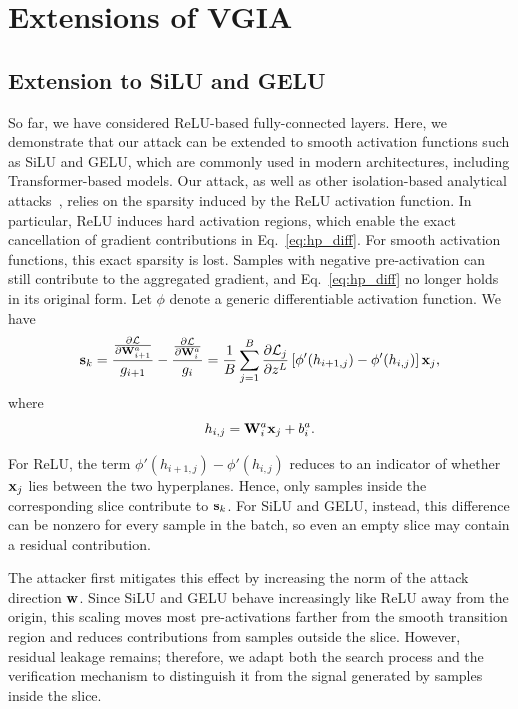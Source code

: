 \section{Extensions of VGIA}

\subsection{Extension to SiLU and GELU}\label{sec:silu_gelu}

So far, we have considered ReLU-based fully-connected layers. Here, we demonstrate that our attack can be extended to smooth activation functions such as SiLU and GELU, which are commonly used in modern architectures, including Transformer-based models. Our attack, as well as other isolation-based analytical attacks~\cite{fowlRobbingFedDirectly2021, fowlDecepticonsCorruptedTransformers2022, boenischWhenCuriousAbandon2023, shiScaleMIAScalableModel2025,ctp_paper}, relies on the sparsity induced by the ReLU activation function. In particular, ReLU induces hard activation regions, which enable the exact cancellation of gradient contributions in Eq.~\eqref{eq:hp_diff}. For smooth activation functions, this exact sparsity is lost. Samples with negative pre-activation can still contribute to the aggregated gradient, and Eq.~\eqref{eq:hp_diff} no longer holds in its original form. Let $\phi$ denote a generic differentiable activation function. We have
\begin{equation}
\mathbf{s}_k
=
\frac{\frac{\partial \mathcal{L}}{\partial \mathbf{W}_{i+1}^a}}{g_{i+1}}
-
\frac{\frac{\partial \mathcal{L}}{\partial \mathbf{W}_i^a}}{g_i}
=
\frac{1}{B}
\sum_{j=1}^{B}
\frac{\partial \mathcal{L}_j}{\partial z^L}
\left[
\phi'\!\left(h_{i+1,j}\right)
-
\phi'\!\left(h_{i,j}\right)
\right]
{\mathbf{x}}_j,
\end{equation}
where
\begin{equation}
h_{i,j}
=
\mathbf{W}_i^a {\mathbf{x}}_j + b_i^a.
\end{equation}

For ReLU, the term
$\phi'(h_{i+1,j})-\phi'(h_{i,j})$
reduces to an indicator of whether ${\mathbf{x}}_j$ lies between the two hyperplanes. Hence, only samples inside the corresponding slice contribute to $\mathbf{s}_k$. For SiLU and GELU, instead, this difference can be nonzero for every sample in the batch, so even an empty slice may contain a residual contribution.

The attacker first mitigates this effect by increasing the norm of the attack direction $\mathbf{w}$. Since SiLU and GELU behave increasingly like ReLU away from the origin, this scaling moves most pre-activations farther from the smooth transition region and reduces contributions from samples outside the slice. However, residual leakage remains; therefore, we adapt both the search process and the verification mechanism to distinguish it from the signal generated by samples inside the slice.

